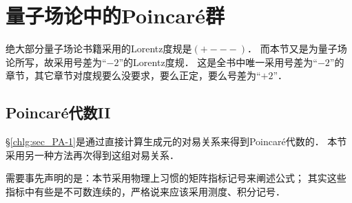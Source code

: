 
\section{量子场论中的Poincar\'{e}群}\label{chlar:sec_poincare}

绝大部分量子场论书籍采用的Lorentz度规是$(+---)$．
而本节又是为量子场论所写，故采用号差为“$-2$”的Lorentz度规．
这是全书中唯一采用号差为“$-2$”的章节，其它章节对度规要么没要求，要么正定，要么号差为“$+2$”．

\subsection{Poincar\'{e}代数II}\label{chlar:sec_PA-2}
\S\ref{chlg:sec_PA-1}是通过直接计算生成元的对易关系来得到Poincar\'{e}代数的．
本节采用另一种方法\cite[\S 10.2]{tung-1985}\cite[\S 2.4]{weinberg_vol1}再次得到这组对易关系．

需要事先声明的是：本节采用物理上习惯的矩阵指标记号来阐述公式；
其实这些指标中有些是不可数连续的，严格说来应该采用测度、积分记号．


